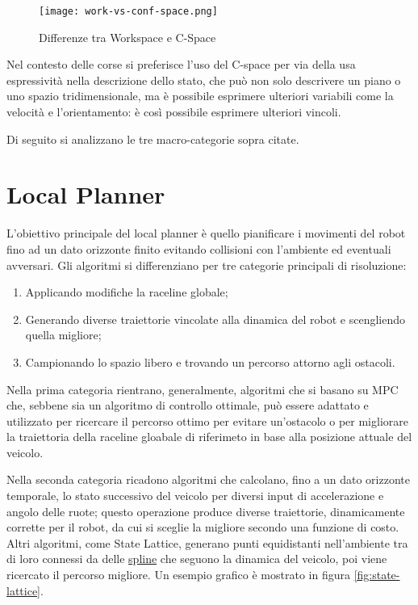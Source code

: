 \begin{figure}[H]
	\begin{center}
		\texttt{[image: work-vs-conf-space.png]}
	\end{center}
	\caption{Differenze tra Workspace e C-Space}\label{fig:work-vs-conf-space}
\end{figure}

Nel contesto delle corse si preferisce l'uso del C-space per via della usa espressività nella descrizione
dello stato, che può non solo descrivere un piano o uno spazio tridimensionale, ma è possibile esprimere
ulteriori variabili come la velocità e l'orientamento: è così possibile esprimere ulteriori vincoli.

\bigskip
\noindent Di seguito si analizzano le tre macro-categorie sopra citate.

\section{Local Planner}
L'obiettivo principale del local planner è quello pianificare i movimenti del robot fino ad un dato
orizzonte finito evitando collisioni con l'ambiente ed eventuali avversari. Gli algoritmi si
differenziano per tre categorie principali di risoluzione:
\begin{enumerate}
	\item Applicando modifiche la raceline globale; 
	\item Generando diverse traiettorie vincolate alla dinamica del robot e scengliendo quella migliore;
	\item Campionando lo spazio libero e trovando un percorso attorno agli ostacoli.
\end{enumerate}
Nella prima categoria rientrano, generalmente, algoritmi che si basano su MPC che, sebbene sia un
algoritmo di controllo ottimale, può essere adattato e utilizzato per ricercare il percorso ottimo per
evitare un'ostacolo o per migliorare la traiettoria della raceline gloabale di riferimeto in base alla
posizione attuale del veicolo.

Nella seconda categoria ricadono algoritmi che calcolano, fino a un dato orizzonte temporale, lo stato
successivo del veicolo per diversi input di accelerazione e angolo delle ruote; questo operazione produce
diverse traiettorie, dinamicamente corrette per il robot, da cui si sceglie la migliore secondo una
funzione di costo. Altri algoritmi, come State Lattice, generano punti equidistanti nell'ambiente tra di
loro connessi da delle \hyperref[par:spline-def]{spline} che seguono la dinamica del veicolo, poi viene
ricercato il percorso migliore. Un esempio grafico è mostrato in figura \ref{fig:state-lattice}.

